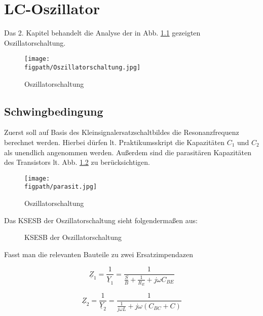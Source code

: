 \def\figpath{tex/2_LC-Oszillator/pictures}
\graphicspath{{tex/2_LC-Oszillator/pictures/}}

\chapter{LC-Oszillator}
Das 2. Kapitel behandelt die Analyse der in Abb. \ref{fig_Kap2_01:Oszillator} gezeigten Oszillatorschaltung.

\begin{figure}[H]
    \centering
    \texttt{[image: \\figpath/Oszillatorschaltung.jpg]}
    \caption{Oszillatorschaltung}
    \label{fig_Kap2_01:Oszillator}
\end{figure}

\section{Schwingbedingung}
Zuerst soll auf Basis des Kleinsignalersatzschaltbildes die Resonanzfrequenz berechnet werden. Hierbei dürfen lt. Praktikumsskript die Kapazitäten $C_1$ und $C_2$ als unendlich angenommen werden. Außerdem sind die parasitären Kapazitäten des Transistors lt. Abb. \ref{fig_Kap2_02:parasit} zu berücksichtigen.

\begin{figure}[H]
    \centering
    \texttt{[image: \\figpath/parasit.jpg]}
    \caption{Oszillatorschaltung}
    \label{fig_Kap2_02:parasit}
\end{figure}

Das KSESB der Oszillatorschaltung sieht folgendermaßen aus:

\begin{figure}[H]
	\centering
	\def\svgwidth{0.8\textwidth}
	
	\caption{KSESB der Oszillatorschaltung} 
	\label{fig:01_QStatAufbau} 
\end{figure}

Fasst man die relevanten Bauteile zu zwei Ersatzimpendazen

\begin{equation}
    \underline{Z}_1 = \frac{1}{\underline{Y}_1} = \frac{1}{\frac{S}{B}+\frac{1}{R_E}+j  \omega C_{BE}}
\end{equation}

\begin{equation}
    \underline{Z}_2 = \frac{1}{\underline{Y}_2} = \frac{1}{\frac{1}{j\omega L}+j \omega \left( C_{BC} + C \right)}
\end{equation}

